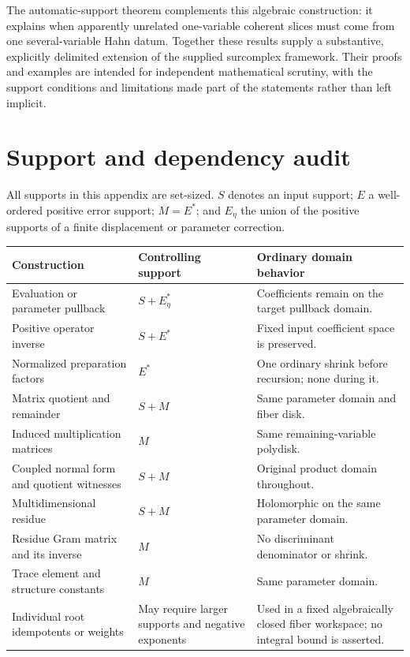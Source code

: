 \documentclass[11pt,oneside]{article}
\numberwithin{equation}{section}
\theoremstyle{definition}
\theoremstyle{remark}\newtheorem{remark}[theorem]{Remark}
\begin{document}
The automatic-support theorem complements this algebraic construction: it explains when apparently unrelated one-variable coherent slices must come from one several-variable Hahn datum. Together these results supply a substantive, explicitly delimited extension of the supplied surcomplex framework. Their proofs and examples are intended for independent mathematical scrutiny, with the support conditions and limitations made part of the statements rather than left implicit.

\clearpage
\appendix
\section{Support and dependency audit}\label{app:support}
All supports in this appendix are set-sized. \(S\) denotes an input support; \(E\) a well-ordered positive error support; \(M=E^*\); and \(E_\eta\) the union of the positive supports of a finite displacement or parameter correction.

\begin{longtable}{@{}L{0.37\textwidth}L{0.23\textwidth}L{0.29\textwidth}@{}}
\toprule
Construction & Controlling support & Ordinary domain behavior\\
\midrule
\endhead
Evaluation or parameter pullback & \(S+E_\eta^*\) & Coefficients remain on the target pullback domain.\\[0.4em]
Positive operator inverse & \(S+E^*\) & Fixed input coefficient space is preserved.\\[0.4em]
Normalized preparation factors & \(E^*\) & One ordinary shrink before recursion; none during it.\\[0.4em]
Matrix quotient and remainder & \(S+M\) & Same parameter domain and fiber disk.\\[0.4em]
Induced multiplication matrices & \(M\) & Same remaining-variable polydisk.\\[0.4em]
Coupled normal form and quotient witnesses & \(S+M\) & Original product domain throughout.\\[0.4em]
Multidimensional residue & \(S+M\) & Holomorphic on the same parameter domain.\\[0.4em]
Residue Gram matrix and its inverse & \(M\) & No discriminant denominator or shrink.\\[0.4em]
Trace element and structure constants & \(M\) & Same parameter domain.\\[0.4em]
Individual root idempotents or weights & May require larger supports and negative exponents & Used in a fixed algebraically closed fiber workspace; no integral bound is asserted.\\
\bottomrule
\end{longtable}
\end{document}
